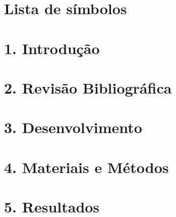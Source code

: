 \documentclass[12pt, a4paper]{report}
\begin{document}
\capa

\folhaderosto
\folhadeaprovacao

\dedicatoria{}
\agradecimentos{}
\epigrafe{}
\resumo{}
\resumolinguaestrangeira{}
\listadefiguras
\listadetabelas
\listadeabreviaturasesiglas

\chapter*{Lista de símbolos}




\sumario

\onehalfspacing		%

\pagestyle{myheadings}


\setcounter{page}{16}
\chapter[Introdução]{1. Introdução}


\chapter[RevisãoBibliográfica]{2. Revisão Bibliográfica}


\chapter[Desenvolvimento]{3. Desenvolvimento}


\chapter[Materiais e Métodos]{4. Materiais e Métodos}


\chapter[Resultados]{5. Resultados}

\end{document}

